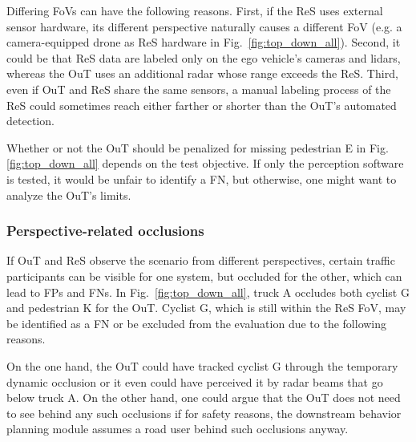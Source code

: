 \documentclass[conference]{IEEEtran}
\begin{document}
Differing FoVs can have the following reasons. %
First, if the ReS uses external sensor hardware, its different perspective naturally causes a different FoV (e.g. a camera-equipped drone as ReS hardware in  Fig.~\ref{fig:top_down_all}). 
Second, it could be that ReS data are labeled only on the ego vehicle's cameras and lidars, whereas the OuT uses an additional radar whose range exceeds the ReS. 
Third, even if OuT and ReS share the same sensors, a manual labeling process of the ReS could sometimes reach either farther or shorter than the OuT's automated detection.

Whether or not the OuT should be penalized for missing pedestrian E in Fig. \ref{fig:top_down_all} depends on the test objective. 
If only the perception software is tested, it would be unfair to identify a FN, but otherwise, one might want to analyze the OuT's limits.


\subsubsection{Perspective-related occlusions}
\label{sec:basic_occlusions}

If OuT and ReS observe the scenario from different perspectives, certain traffic participants can be visible for one system, but occluded for the other, which can lead to FPs and FNs. 
In Fig.~\ref{fig:top_down_all}, truck A occludes both cyclist G and pedestrian K for the OuT. 
Cyclist G, which is still within the ReS FoV, may be identified as a FN or be excluded from the evaluation due to the following reasons. 

On the one hand, the OuT could have tracked cyclist G through the temporary dynamic occlusion or it even could have perceived it by radar beams that go below truck A. 
On the other hand, one could argue that the OuT does not need to see behind any such occlusions if for safety reasons, the downstream behavior planning module assumes a road user behind such occlusions anyway.
\end{document}
